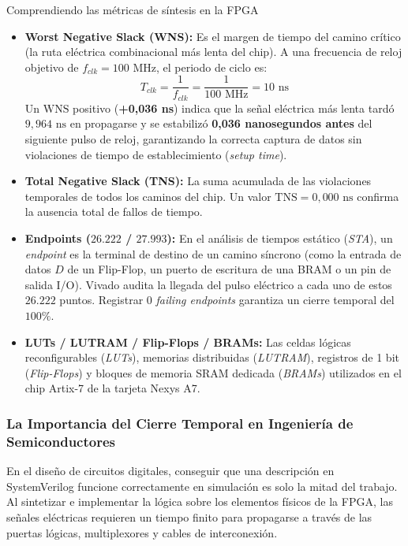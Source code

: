 \documentclass[10pt,a4paper]{article}
\begin{document}
\begin{conceptbox}{Comprendiendo las métricas de síntesis en la FPGA}
    \begin{itemize}
        \item \textbf{Worst Negative Slack (WNS):} Es el margen de tiempo del camino crítico (la ruta eléctrica combinacional más lenta del chip). A una frecuencia de 
        reloj objetivo de $f_{clk} = 100\text{ MHz}$, el periodo de ciclo es:
        \begin{equation*}
            T_{clk} = \frac{1}{f_{clk}} = \frac{1}{100\text{ MHz}} = 10\text{ ns}
        \end{equation*}
        Un $\text{WNS}$ positivo (\textbf{+0,036 ns}) indica que la señal eléctrica más lenta tardó $9,964\text{ ns}$ en propagarse y se estabilizó 
        \textbf{0,036 nanosegundos antes} del siguiente pulso de reloj, garantizando la correcta captura de datos sin violaciones de tiempo de establecimiento 
        (\textit{setup time}).
        \item \textbf{Total Negative Slack (TNS):} La suma acumulada de las violaciones temporales de todos los caminos del chip. Un valor $\text{TNS} = 
        0,000\text{ ns}$ confirma la ausencia total de fallos de tiempo.
        \item \textbf{Endpoints ($26.222$ / $27.993$):} En el análisis de tiempos estático (\textit{STA}), un \textit{endpoint} es la terminal de destino de un 
        camino síncrono (como la entrada de datos $D$ de un Flip-Flop, un puerto de escritura de una BRAM o un pin de salida I/O). Vivado audita la llegada del 
        pulso eléctrico a cada uno de estos $26.222$ puntos. Registrar $0$ \textit{failing endpoints} garantiza un cierre temporal del $100\%$.
        \item \textbf{LUTs / LUTRAM / Flip-Flops / BRAMs:} Las celdas lógicas reconfigurables (\textit{LUTs}), memorias distribuidas (\textit{LUTRAM}), registros de 
        1 bit (\textit{Flip-Flops}) y bloques de memoria SRAM dedicada (\textit{BRAMs}) utilizados en el chip Artix-7 de la tarjeta Nexys A7.
    \end{itemize}
\end{conceptbox}

\subsubsection{La Importancia del Cierre Temporal en Ingeniería de Semiconductores}
En el diseño de circuitos digitales, conseguir que una descripción en SystemVerilog funcione correctamente en simulación es solo la mitad del trabajo. Al sintetizar e 
implementar la lógica sobre los elementos físicos de la FPGA, las señales eléctricas requieren un tiempo finito para propagarse a través de las puertas lógicas, 
multiplexores y cables de interconexión.
\end{document}
